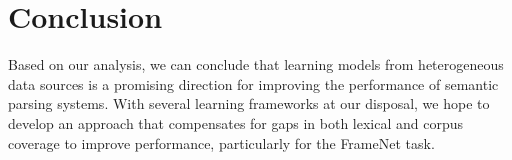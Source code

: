 \documentclass[11pt]{article}
\newcommand{\ensuretext}[1]{#1}
\newcommand{\nssmarker}{\ensuretext{\textcolor{magenta}{\ensuremath{^{\textsc{NS}}_{\textsc{S}}}}}}
\newcommand{\arkcomment}[3]{\ensuretext{\textcolor{#3}{[#1 #2]}}}
\newcommand{\nss}[1]{\arkcomment{\nssmarker}{#1}{magenta}}
\newcommand{\finalversion}[1]{}
\begin{document}

\section{Conclusion}

Based on our analysis, we can conclude that learning models from heterogeneous data sources 
is a promising direction for improving the performance of semantic parsing systems.
With several learning frameworks at our disposal, we hope to develop an approach 
that compensates for gaps in both lexical and corpus coverage to improve performance, particularly for the FrameNet task.

\finalversion{\section*{Acknowledgments}

\nss{TODO}}


{\fontsize{10}{12.25}\selectfont
}
\end{document}
